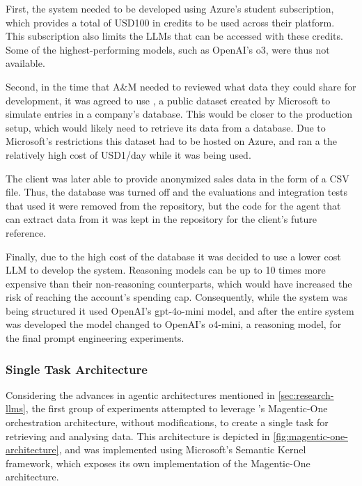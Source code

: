 \documentclass[a4paper]{report}
\begin{document}
First, the system needed to be developed using Azure's student subscription, which provides a total of USD100 in credits to be used across their platform. This subscription also limits the LLMs that can be accessed with these credits. Some of the highest-performing models, such as OpenAI's o3, were thus not available.

Second, in the time that A\&M needed to reviewed what data they could share for development, it was agreed to use \cite{wideworldimporters2025}, a public dataset created by Microsoft to simulate entries in a company's database. This would be closer to the production setup, which would likely need to retrieve its data from a database. Due to Microsoft's restrictions this dataset had to be hosted on Azure, and ran a the relatively high cost of USD1/day while it was being used.

The client was later able to provide anonymized sales data in the form of a CSV file. Thus, the database was turned off and the evaluations and integration tests that used it were removed from the repository, but the code for the agent that can extract data from it was kept in the repository for the client's future reference.

Finally, due to the high cost of the database it was decided to use a lower cost LLM to develop the system. Reasoning models can be up to 10 times more expensive than their non-reasoning counterparts, which would have increased the risk of reaching the account's spending cap. Consequently, while the system was being structured it used OpenAI's gpt-4o-mini model, and after the entire system was developed the model changed to OpenAI's o4-mini, a reasoning model, for the final prompt engineering experiments.

\subsubsection{Single Task Architecture}

Considering the advances in agentic architectures mentioned in \autoref{sec:research-llms}, the first group of experiments attempted to leverage \cite{fourney2024magenticone}'s Magentic-One orchestration architecture, without modifications, to create a single task for retrieving and analysing data. This architecture is depicted in \autoref{fig:magentic-one-architecture}, and was implemented using Microsoft's Semantic Kernel framework, which exposes its own implementation of the Magentic-One architecture.
\end{document}
